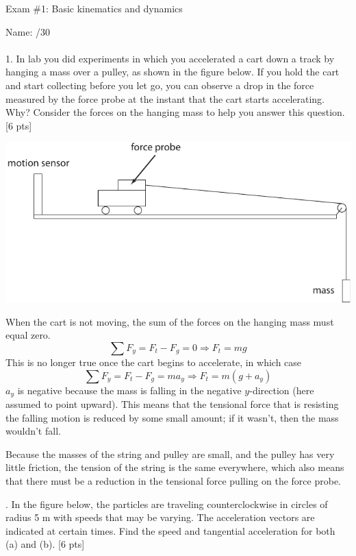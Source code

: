 \documentclass[11pt,letterpaper]{article}
\newcommand{\sol}[1]{{\color{White} #1}} %
\begin{document}
\setlength{\parindent}{0cm}
\setlength{\parskip}{11pt}
Exam \#1: Basic kinematics and dynamics

Name: \hfill /30\\

\hrulefill\\
1. In lab you did experiments in which you accelerated a cart down a track by hanging a mass over a pulley, as shown in the figure below. If you hold the cart and start collecting before you let go, you can observe a drop in the force measured by the force probe at the instant that the cart starts accelerating. Why? Consider the forces on the hanging mass to help you answer this question. [6 pts]

\includegraphics[width=\textwidth]{../../labs/lab3-forces/cart_and_pulley.pdf}

\sol{When the cart is not moving, the sum of the forces on the hanging mass must equal zero.
\begin{equation}
\sum F_y = F_t - F_g = 0 \Rightarrow F_t = mg
\end{equation}
This is no longer true once the cart begins to accelerate, in which case
\begin{equation}
\sum F_y = F_t - F_g = ma_y \Rightarrow F_t = m(g+a_y)
\end{equation}
$a_y$ is negative because the mass is falling in the negative $y$-direction (here assumed to point upward). This means that the tensional force that is resisting the falling motion is reduced by some small amount; if it wasn't, then the mass wouldn't fall.

Because the masses of the string and pulley are small, and the pulley has very little friction, the tension of the string is the same everywhere, which also means that there must be a reduction in the tensional force pulling on the force probe.

}

. In the figure below, the particles are traveling counterclockwise in circles of radius 5 m with speeds that may be varying. The acceleration vectors are indicated at certain times. Find the speed and tangential acceleration for both (a) and (b). [6 pts]
\end{document}
